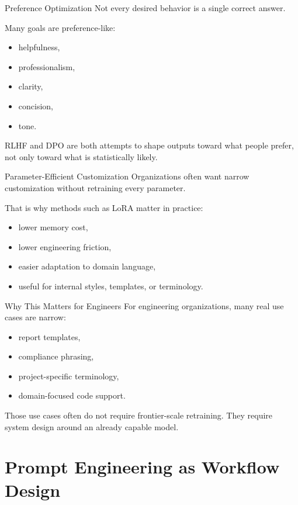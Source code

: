 \documentclass[12pt]{beamer}
\begin{document}
\begin{frame}{Preference Optimization}
  Not every desired behavior is a single correct answer.

  Many goals are preference-like:
  \begin{itemize}
    \item helpfulness,
    \item professionalism,
    \item clarity,
    \item concision,
    \item tone.
  \end{itemize}

  RLHF and DPO are both attempts to shape outputs toward what people prefer, not only toward what is statistically likely.
\end{frame}

\begin{frame}{Parameter-Efficient Customization}
  Organizations often want narrow customization without retraining every parameter.

  That is why methods such as LoRA matter in practice:
  \begin{itemize}
    \item lower memory cost,
    \item lower engineering friction,
    \item easier adaptation to domain language,
    \item useful for internal styles, templates, or terminology.
  \end{itemize}
\end{frame}

\begin{frame}{Why This Matters for Engineers}
  For engineering organizations, many real use cases are narrow:
  \begin{itemize}
    \item report templates,
    \item compliance phrasing,
    \item project-specific terminology,
    \item domain-focused code support.
  \end{itemize}

  Those use cases often do not require frontier-scale retraining. They require system design around an already capable model.
\end{frame}

\section{Prompt Engineering as Workflow Design}
\end{document}
